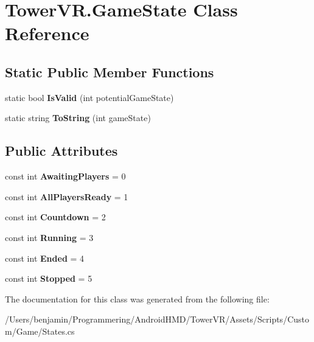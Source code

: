 \hypertarget{class_tower_v_r_1_1_game_state}{}\section{Tower\+V\+R.\+Game\+State Class Reference}
\label{class_tower_v_r_1_1_game_state}
\subsection*{Static Public Member Functions}
\begin{DoxyCompactItemize}
\item 
static bool {\bfseries Is\+Valid} (int potential\+Game\+State)\hypertarget{class_tower_v_r_1_1_game_state_a6fc01d6c810e87cbf1c2437555bbf57c}{}\label{class_tower_v_r_1_1_game_state_a6fc01d6c810e87cbf1c2437555bbf57c}

\item 
static string {\bfseries To\+String} (int game\+State)\hypertarget{class_tower_v_r_1_1_game_state_ac8a1ed13699e9c5f45a5817ba67016d3}{}\label{class_tower_v_r_1_1_game_state_ac8a1ed13699e9c5f45a5817ba67016d3}

\end{DoxyCompactItemize}
\subsection*{Public Attributes}
\begin{DoxyCompactItemize}
\item 
const int {\bfseries Awaiting\+Players} = 0\hypertarget{class_tower_v_r_1_1_game_state_ae1c3652510fbccdbd9e27881186d048f}{}\label{class_tower_v_r_1_1_game_state_ae1c3652510fbccdbd9e27881186d048f}

\item 
const int {\bfseries All\+Players\+Ready} = 1\hypertarget{class_tower_v_r_1_1_game_state_a980af313c89a7a078865487cb41cecc1}{}\label{class_tower_v_r_1_1_game_state_a980af313c89a7a078865487cb41cecc1}

\item 
const int {\bfseries Countdown} = 2\hypertarget{class_tower_v_r_1_1_game_state_a04401290d6914dcbccd7fb1084d8c218}{}\label{class_tower_v_r_1_1_game_state_a04401290d6914dcbccd7fb1084d8c218}

\item 
const int {\bfseries Running} = 3\hypertarget{class_tower_v_r_1_1_game_state_afa0cb64d0a46d5a76854e5f14fe13124}{}\label{class_tower_v_r_1_1_game_state_afa0cb64d0a46d5a76854e5f14fe13124}

\item 
const int {\bfseries Ended} = 4\hypertarget{class_tower_v_r_1_1_game_state_a5ebc33265691399fa072175e11b8171d}{}\label{class_tower_v_r_1_1_game_state_a5ebc33265691399fa072175e11b8171d}

\item 
const int {\bfseries Stopped} = 5\hypertarget{class_tower_v_r_1_1_game_state_a61e6560948f61cadb59a8f4069654196}{}\label{class_tower_v_r_1_1_game_state_a61e6560948f61cadb59a8f4069654196}

\end{DoxyCompactItemize}


The documentation for this class was generated from the following file\+:\begin{DoxyCompactItemize}
\item 
/\+Users/benjamin/\+Programmering/\+Android\+H\+M\+D/\+Tower\+V\+R/\+Assets/\+Scripts/\+Custom/\+Game/States.\+cs\end{DoxyCompactItemize}
